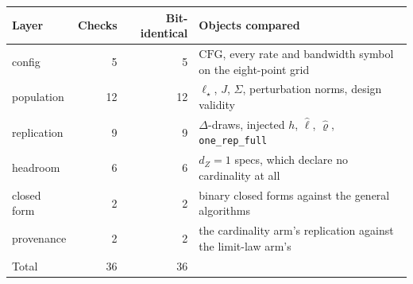 \begin{tabular}{lrrl}
\toprule
Layer & Checks & Bit-identical & Objects compared \\
\midrule
config & 5 & 5 & $\mathrm{CFG}$, every rate and bandwidth symbol on the eight-point grid \\
population & 12 & 12 & $\ell_\star$, $J$, $\Sigma$, perturbation norms, design validity \\
replication & 9 & 9 & $\Delta$-draws, injected $h$, $\hat\ell$, $\hat\varrho$, \texttt{one\_rep\_full} \\
headroom & 6 & 6 & $d_Z=1$ specs, which declare no cardinality at all \\
closed form & 2 & 2 & binary closed forms against the general algorithms \\
provenance & 2 & 2 & the cardinality arm's replication against the limit-law arm's \\
\midrule
Total & 36 & 36 & \\
\bottomrule
\end{tabular}
